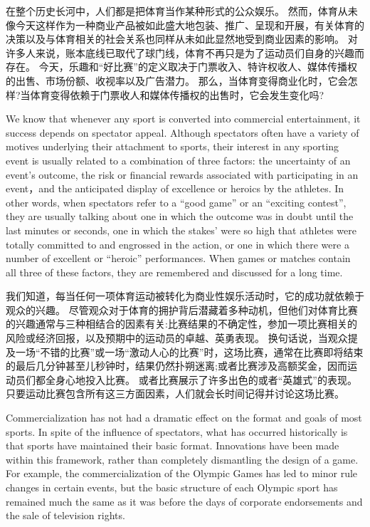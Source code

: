\documentclass[cs4size, a4paper, 12pt]{article}
\newcounter{numpar}
\newcommand*{\newpar}{\numpar{}}
\begin{document}
	在整个历史长河中，人们都是把体育当作某种形式的公众娱乐。 然而，体育从未像今天这样作为一种商业产品被如此盛大地包装、推广、呈现和开展，有关体育的决策以及与体育相关的社会关系也同样从未如此显然地受到商业因素的影响。 对许多人来说，账本底线已取代了球门线，体育不再只是为了运动员们自身的兴趣而存在。 今天，乐趣和``好比赛''的定义取决于门票收入、特许权收人、媒体传播权的出售、市场份额、收视率以及广告潜力。 那么，当体育变得商业化时，它会怎样?当体育变得依赖于门票收人和媒体传播权的出售时，它会发生变化吗?
	
	\newpar We know that whenever any sport is converted into commercial entertainment, it success depends on spectator appeal. Although spectators often have a variety of motives underlying their attachment to sports, their interest in any sporting event is usually related to a combination of three factors: the uncertainty of an event's outcome, the risk or financial rewards associated with participating in an event，and the anticipated display of excellence or heroics by the athletes. In other words, when spectators refer to a ``good game'' or an ``exciting contest'', they are usually talking about one in which the outcome was in doubt until the last minutes or seconds, one in which the stakes' were so high that athletes were totally committed to and engrossed in the action, or one in which there were a number of excellent or ``heroic'' performances. When games or matches contain all three of these factors, they are remembered and discussed for a long time.
	
	我们知道，每当任何一项体育运动被转化为商业性娱乐活动时，它的成功就依赖于观众的兴趣。 尽管观众对于体育的拥护背后潜藏着多种动机，但他们对体育比赛的兴趣通常与三种相结合的因素有关:比赛结果的不确定性，参加一项比赛相关的风险或经济回报，以及预期中的运动员的卓越、英勇表现。 换句话说，当观众提及一场``不错的比赛''或一场``激动人心的比赛''时，这场比赛，通常在比赛即将结束的最后几分钟甚至儿秒钟时，结果仍然扑朔迷离;或者比赛涉及高额奖金，因而运动员们都全身心地投入比赛。 或者比赛展示了许多出色的或者``英雄式''的表现。 只要运动比赛包含所有这三方面因素，人们就会长时间记得并讨论这场比赛。 
	
	\newpar Commercialization has not had a dramatic effect on the format and goals of most sports. In spite of the influence of spectators, what has occurred historically is that sports have maintained their basic format. Innovations have been made within this framework, rather than completely dismantling the design of a game. For example, the commercialization of the Olympic Games has led to minor rule changes in certain events, but the basic structure of each Olympic sport has remained much the same as it was before the days of corporate endorsements and the sale of television rights.
	
\end{document}
